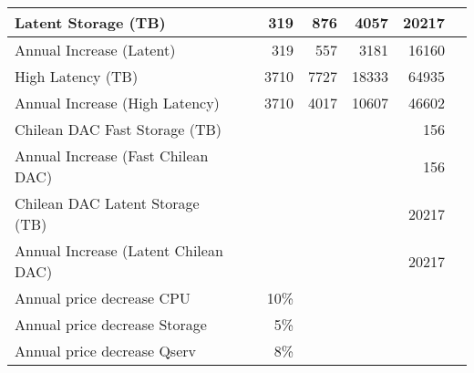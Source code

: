 \begin{longtable} { |p{}  |r  |r  |r  |r  |r  |r |}
{Latent Storage  (TB)}&{}&{319}&{876}&{4057}&{20217} \\ \hline
{Annual Increase (Latent)}&{}&{319}&{557}&{3181}&{16160} \\ \hline
{High Latency (TB)}&{}&{3710}&{7727}&{18333}&{64935} \\ \hline
{Annual Increase (High Latency)}&{}&{3710}&{4017}&{10607}&{46602} \\ \hline
{Chilean DAC Fast Storage (TB)}&{}&{}&{}&{}&{156} \\ \hline
{Annual Increase (Fast Chilean DAC)}&{}&{}&{}&{}&{156} \\ \hline
{Chilean DAC Latent Storage (TB)}&{}&{}&{}&{}&{20217} \\ \hline
{Annual Increase (Latent Chilean DAC)}&{}&{}&{}&{}&{20217} \\ \hline
{Annual price decrease CPU}&{}&{10\%}&{}&{}&{} \\ \hline
{Annual price decrease Storage}&{}&{5\%}&{}&{}&{} \\ \hline
{Annual price decrease Qserv}&{}&{8\%}&{}&{}&{} \\ \hline
\end{longtable} \normalsize
